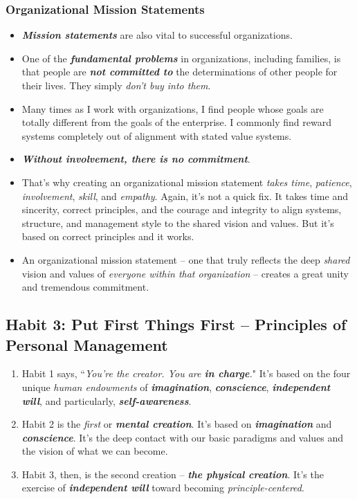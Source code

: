 \documentclass[11pt]{article}
\begin{document}
\subsubsection{Organizational Mission Statements}
\begin{itemize}
\item \emph{\textbf{Mission statements}} are also vital to successful organizations. 

\item One of the \emph{\textbf{fundamental problems}} in organizations, including families, is that people are \emph{\textbf{not committed to}} the determinations of other people for their lives. They simply \emph{don't buy into them}.

\item Many times as I work with organizations, I find people whose goals are totally different from the goals of the enterprise. I commonly find reward systems completely out of alignment with stated value systems.

\item \emph{\textbf{Without involvement, there is no commitment}}. 

\item That's why creating an organizational mission statement \emph{takes time}, \emph{patience}, \emph{involvement}, \emph{skill}, and \emph{empathy}. Again, it's not a quick fix. It takes time and sincerity, correct principles, and the courage and integrity to align systems, structure, and management style to the shared vision and values. But it's based on correct principles and it works.

\item An organizational mission statement -- one that truly reflects the deep \emph{shared} vision and values of \emph{everyone within that organization} -- creates a great unity and tremendous commitment.
\end{itemize}
\subsection{Habit 3: Put First Things First -- Principles of Personal Management}
 \begin{enumerate}
\item Habit 1 says, ``\emph{You're the creator. You are \textbf{in charge}.}" It's based on the four unique \emph{human endowments} of \emph{\textbf{imagination}}, \emph{\textbf{conscience}}, \emph{\textbf{independent will}}, and particularly, \emph{\textbf{self-awareness}}. 
\item Habit 2 is the \emph{first} or \emph{\textbf{mental creation}}.  It's based on \emph{\textbf{imagination}} and \emph{\textbf{conscience}}.  It's the deep contact with our basic paradigms and values and the vision of
what we can become.
\item Habit 3, then, is the second creation -- \emph{\textbf{the physical creation}}. It's the exercise of \emph{\textbf{independent will}} toward becoming \emph{principle-centered}. 
\end{enumerate}
\end{document}
